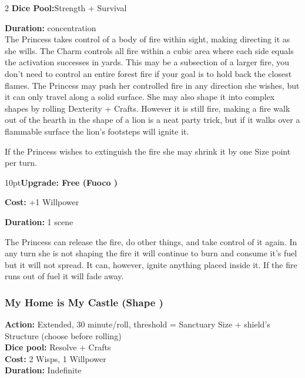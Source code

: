 \begin{multicols}{2}
\noindent \textbf{Dice Pool:}Strength + Survival

\noindent \textbf{Duration:} concentration \\

\noindent The Princess takes control of a body of fire within sight, making directing it as she wills. The Charm controls all fire within a cubic area where each side equals the activation successes in yards. This may be a subsection of a larger fire, you don't need to control an entire forest fire if your goal is to hold back the closest flames. The Princess may push her controlled fire in any direction she wishes, but it can only travel along a solid surface. She may also shape it into complex shapes by rolling Dexterity + Crafts. However it is still fire, making a fire walk out of the hearth in the shape of a lion is a neat party trick, but if it walks over a flammable surface the lion's footsteps will ignite it. 

If the Princess wishes to extinguish the fire she may shrink it by one Size point per turn. 

\begin{myindentpar}{10pt}\textbf{Upgrade: Free (Fuoco \textbullet\textbullet\textbullet\textbullet)}

\noindent \textbf{Cost:} +1 Willpower

\noindent \textbf{Duration:} 1 scene

The Princess can release the fire, do other things, and take control of it again. In any turn she is not shaping the fire it will continue to burn and consume it's fuel but it will not spread. It can, however, ignite anything placed inside it. If the fire runs out of fuel it will fade away.\end{myindentpar}

\subsubsection*{My Home is My Castle (Shape \textbullet\textbullet\textbullet)}

\textbf{Action:} Extended, 30 minute/roll, threshold = Sanctuary Size + shield’s Structure (choose before rolling)\\
\textbf{Dice pool:} Resolve + Crafts\\
\textbf{Cost:} 2 Wisps, 1 Willpower\\
\textbf{Duration:} Indefinite\\


\end{multicols}
